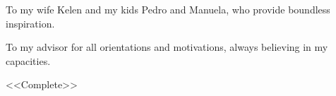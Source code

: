 To my wife Kelen and my kids Pedro and Manuela, who provide boundless inspiration.

To my advisor for all orientations and motivations, always believing in my capacities.

<<Complete>>